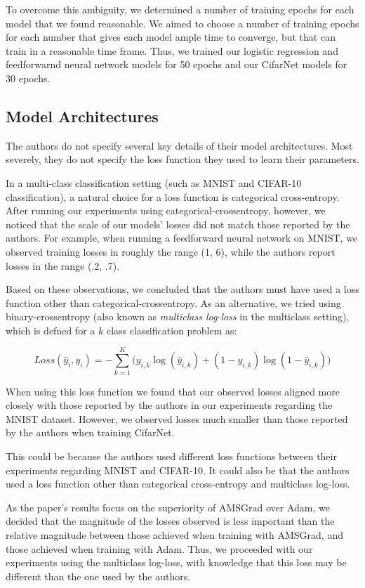 \documentclass[letterpaper, 10 pt, conference]{ieeeconf}  %
\begin{document}
To overcome this ambiguity, we determined a number of training epochs for each model that we found reasonable. We aimed to choose a number of training epochs for each number that gives each model ample time to converge, but that can train in a reasonable time frame. Thus, we trained our logistic regression and feedforwarnd neural network models for 50 epochs and our CifarNet models for 30 epochs. 

\subsection{Model Architectures}

The authors do not specify several key details of their model architectures. Most severely, they do not specify the loss function they used to learn their parameters. 

In a multi-class classification setting (such as MNIST and CIFAR-10 classification), a natural choice for a loss function is categorical cross-entropy. After running our experiments using categorical-crossentropy, however, we noticed that the scale of our models' losses did not match those reported by the authors. For example, when running a feedforward neural network on MNIST, we observed training losses in roughly the range (1, 6), while the authors report losses in the range (.2, .7). 

Based on these observations, we concluded that the authors must have used a loss function other than categorical-crossentropy. As an alternative, we tried using binary-crossentropy (also known as \emph{multiclass log-loss} in the multiclass setting), which is defned for a $k$ class classification problem as:

\[
Loss(\hat{y}_i, y_i) = -\sum_{k = 1}^K \big( y_{i,k}\log(\hat{y}_{i,k}) + (1 - y_{i,k})\log(1 - \hat{y}_{i,k})  \big)
\]

When using this loss function we found that our observed losses aligned more closely with those reported by the authors in our experiments regarding the MNIST dataset. However, we observed losses much smaller than those reported by the authors when training CifarNet. 

This could be because the authors used different loss functions between their experiments regarding MNIST and CIFAR-10. It could also be that the authors used a loss function other than categorical cross-entropy and multiclass log-loss.

As the paper's results focus on the superiority of AMSGrad over Adam, we decided that the magnitude of the losses observed is less important than the relative magnitude between those achieved when training with AMSGrad, and those achieved when training with Adam. Thus, we proceeded with our experiments using the multiclass log-loss, with knowledge that this loss may be different than the one used by the authors.
\end{document}
